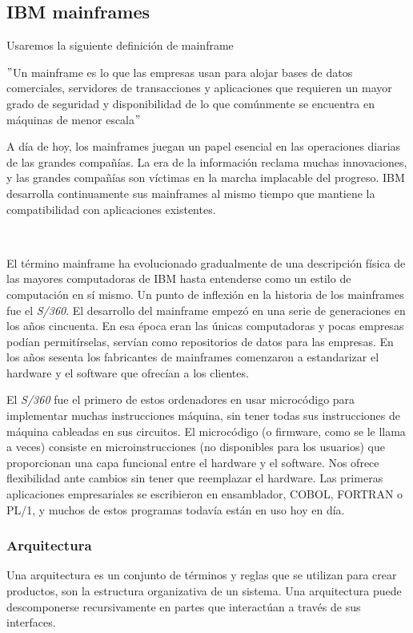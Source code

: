\documentclass[paper=a4, fontsize=10pt]{scrartcl} %
\numberwithin{equation}{section} %
\numberwithin{figure}{section} %
\numberwithin{table}{section} %
\begin{document}
\subsection{IBM mainframes}
Usaremos la siguiente definición de mainframe
\begin{center}
	$"$Un mainframe es lo que las empresas usan para alojar bases de datos comerciales, servidores de transacciones y aplicaciones que requieren un mayor grado de seguridad y disponibilidad de lo que comúnmente se encuentra en máquinas de menor escala$"$ \cite{ibm-mainframes}
\end{center}
A día de hoy, los mainframes juegan un papel esencial en las operaciones diarias de las grandes compañías.
La era de la información reclama muchas innovaciones, y las grandes compañías son víctimas en la marcha implacable del progreso.
IBM desarrolla continuamente sus mainframes al mismo tiempo que mantiene la compatibilidad con aplicaciones existentes.

\

El término mainframe ha evolucionado gradualmente de una descripción física de las mayores computadoras de IBM hasta entenderse como un estilo de computación en sí mismo.
Un punto de inflexión en la historia de los mainframes fue el \textit{S/360}.
El desarrollo del mainframe empezó en una serie de generaciones en los años cincuenta.
En esa época eran las únicas computadoras y pocas empresas podían permitírselas, servían como repositorios de datos para las empresas.
En los años sesenta los fabricantes de mainframes comenzaron a estandarizar el hardware y el software que ofrecían a los clientes.


El \textit{S/360} fue el primero de estos ordenadores en usar microcódigo para implementar muchas instrucciones máquina, sin tener todas sus instrucciones de máquina cableadas en sus circuitos. 
El microcódigo (o firmware, como se le llama a veces) consiste en microinstrucciones (no disponibles para los usuarios) que proporcionan una capa funcional entre el hardware y el software.
Nos ofrece flexibilidad ante cambios sin tener que reemplazar el hardware.
Las primeras aplicaciones empresariales se escribieron en ensamblador, COBOL, FORTRAN o PL/1, y muchos de estos programas todavía están en uso hoy en día.

\subsubsection{Arquitectura}
Una arquitectura es un conjunto de términos y reglas que se utilizan para crear productos, son la estructura organizativa de un sistema.
Una arquitectura puede descomponerse recursivamente en partes que interactúan a través de sus interfaces.
\end{document}
